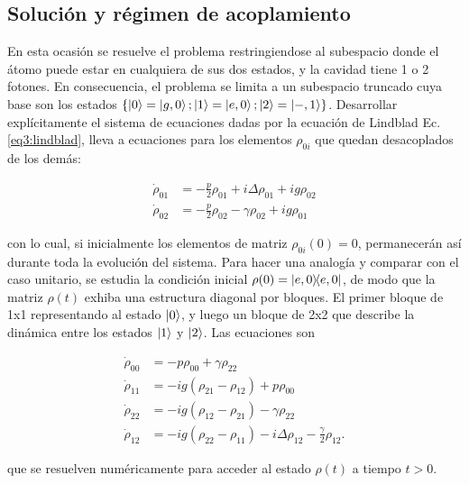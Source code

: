 \subsection{Solución y régimen de acoplamiento}\label{sec3:regimen acoplamiento}
En esta ocasión se resuelve el problema restringiendose al subespacio donde el átomo puede estar en cualquiera de sus dos estados, y la cavidad tiene 1 o 2 fotones. En consecuencia, el problema se limita a un subespacio truncado cuya base son los estados $\{ \ket{0}=\ket{g,0} ; \ket{1}=\ket{e,0} ; \ket{2}=\ket{-,1} \}$. Desarrollar explícitamente el sistema de ecuaciones dadas por la ecuación de Lindblad Ec. \ref{eq3:lindblad}, lleva a ecuaciones para los elementos $\rho_{0i}$ que quedan desacoplados de los demás:

\begin{equation}
    \begin{aligned}
        \dot \rho_{01} & =-\frac{p}{2} \rho_{01}+i\Delta\rho_{01}+ig\rho_{02} \\
        \dot \rho_{02} & =-\frac{p}{2} \rho_{02}-\gamma \rho_{02}+ig\rho_{01}
    \end{aligned}
\end{equation}

con lo cual, si inicialmente los elementos de matriz $\rho_{0i}(0)=0$, permanecerán así durante toda la evolución del sistema. Para hacer una analogía y comparar con el caso unitario, se estudia la condición inicial $\rho(0)=\ketbra{e,0}{e,0}$, de modo que la matriz $\rho(t)$ exhiba una estructura diagonal por bloques. El primer bloque de 1x1 representando al estado $\ket{0}$, y luego un bloque de 2x2 que describe la dinámica entre los estados $\ket{1}$ y $\ket{2}$. Las ecuaciones son

\begin{equation}
\begin{aligned}
\dot{\rho}_{00} &= -p \rho_{00} + \gamma \rho_{22} \\
\dot{\rho}_{11} &= -i g (\rho_{21} - \rho_{12}) + p \rho_{00} \\
\dot{\rho}_{22} &= -i g (\rho_{12} - \rho_{21}) - \gamma \rho_{22} \\
\dot{\rho}_{12} &= -i g (\rho_{22} - \rho_{11}) - i \Delta \rho_{12} - \frac{\gamma}{2} \rho_{12}.
\end{aligned}
\end{equation}

que se resuelven numéricamente para acceder al estado $\rho(t)$ a tiempo $t>0$. 

